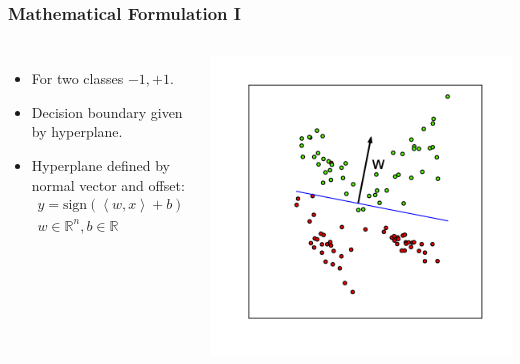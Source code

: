 \begin{frame}
    \frametitle{Mathematical Formulation I}
    \begin{columns}
        \begin{itemize}
            \item For two classes $-1, +1$.
            \item Decision boundary given by hyperplane.
            \item Hyperplane defined by normal vector and offset:
                \begin{gather*}
                    y = \text{sign}(\left<w, x\right> + b)\\
                    w \in \mathbb{R}^n, b \in \mathbb{R}
                \end{gather*}
        \end{itemize}
            \includegraphics[width=1\linewidth]{logreg-pics/synthetic_line_w}\\

    \end{columns}
\end{frame}

